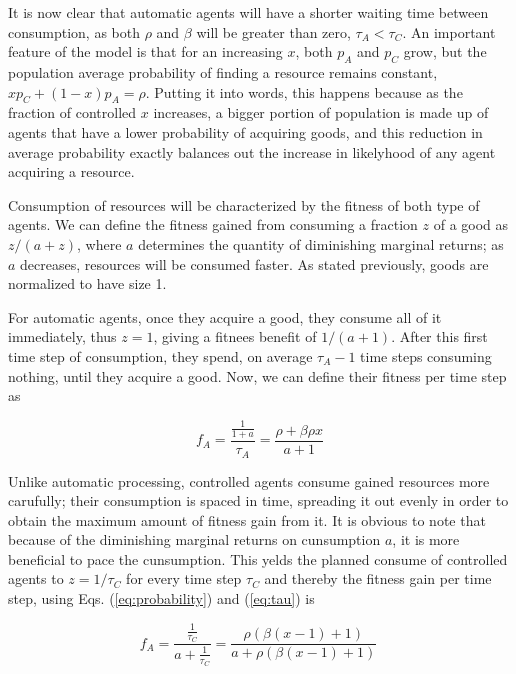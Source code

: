 \documentclass[10pt,a4paper]{article}
\begin{document}
It is now clear that automatic agents will have a shorter waiting time between consumption, as both $\rho$ and $\beta$ will be greater than zero, $\tau_A < \tau_C$.
An important feature of the model is that for an increasing $x$, both $p_A$ and $p_C$ grow, but the population average probability of finding a resource remains
constant, $x p_C + (1-x)p_A = \rho$. Putting it into words, this happens because as the fraction of controlled $x$ increases, a bigger portion of
population is made up of agents that have a lower probability of acquiring goods, and this reduction in average probability exactly 
balances out the increase in likelyhood of any agent acquiring a resource.

Consumption of resources will be characterized by the fitness of both type of agents. We can define the fitness gained from consuming a fraction $z$ of a good as
$z/(a+z)$, where $a$ determines the quantity of diminishing marginal returns; as $a$ decreases, resources will be consumed faster. As stated previously, goods are
normalized to have size 1.

For automatic agents, once they acquire a good, they consume all of it immediately, thus $z=1$, giving a fitnees benefit of $1/(a+1)$. After this first time step of 
consumption, they spend, on average $\tau_A -1$ time steps consuming nothing, until they acquire a good. Now, we can define their fitness per time step as

\begin{equation}
f_A = \frac{\displaystyle\frac{1}{1+a}}{\tau_A} = \frac{\rho + \beta \rho x}{a+1}
 \label{fittness:a}
\end{equation}

Unlike automatic processing, controlled agents consume gained resources more carufully; their consumption is spaced in time, spreading it out evenly in order to obtain 
the maximum amount of fitness gain from it. It is obvious to note that because of the diminishing marginal returns on cunsumption $a$, it is more beneficial to
pace the cunsumption. This yelds the planned consume of controlled agents to  $z=1/\tau_C$ for every time step $\tau_C$ and thereby the fitness gain per time step, 
using Eqs. (\ref{eq:probability}) and (\ref{eq:tau}) is

\begin{equation}
f_A = \frac{\displaystyle\frac{1}{\tau_C}}{a+\displaystyle\frac{1}{\tau_C}} = \frac{\rho(\beta(x-1) +1)}{a+\rho(\beta(x-1)+1)}
 \label{fittness:c}~
\end{equation}
\end{document}
